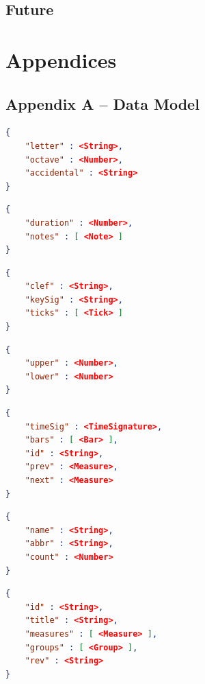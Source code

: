 \documentclass[letterpaper,12pt]{article}
\begin{document}
\subsection{Future}

\newpage

\section{Appendices}

\subsection{Appendix A -- Data Model}

\begin{lstlisting}[language=json, caption=Note]
{
    "letter" : <String>,
    "octave" : <Number>,
    "accidental" : <String>
}
\end{lstlisting}

\begin{lstlisting}[language=json, caption=Tick]
{
    "duration" : <Number>,
    "notes" : [ <Note> ]
}
\end{lstlisting}

\begin{lstlisting}[language=json, caption=Bar]
{
    "clef" : <String>,
    "keySig" : <String>,
    "ticks" : [ <Tick> ]
}
\end{lstlisting}

\begin{lstlisting}[language=json, caption=TimeSignature]
{
    "upper" : <Number>,
    "lower" : <Number>
}
\end{lstlisting}

\begin{lstlisting}[language=json, caption=Measure]
{
    "timeSig" : <TimeSignature>,
    "bars" : [ <Bar> ],
    "id" : <String>,
    "prev" : <Measure>,
    "next" : <Measure>
}
\end{lstlisting}

\begin{lstlisting}[language=json, caption=Group]
{
    "name" : <String>,
    "abbr" : <String>,
    "count" : <Number>
}
\end{lstlisting}

\begin{lstlisting}[language=json, caption=MusicScore]
{
    "id" : <String>,
    "title" : <String>,
    "measures" : [ <Measure> ],
    "groups" : [ <Group> ],
    "rev" : <String>
}
\end{lstlisting}
\end{document}
